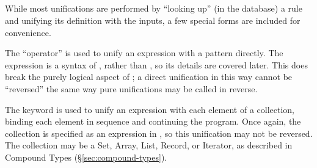 \begin{bnf*}
     \\
     \\
     \\
     \\
\end{bnf*}

While most unifications are performed by ``looking up'' (in the database)
a rule and unifying its definition with the inputs, a few special forms are
included for convenience.

The \op{=} ``operator'' is used to unify an expression with a pattern directly. The
expression is a syntax of \Poetry{}, rather than \Law{}, so its details are covered
later. This does break the purely logical aspect of \Law{}; a direct unification in
this way cannot be ``reversed'' the same way pure \Law{} unifications may be called
in reverse.

\begin{prooftree}
\end{prooftree}

The  keyword is used to unify an expression with each element of a collection,
binding each element in sequence and continuing the program. Once again, the collection
is specified as an expression in \Poetry{}, so this unification may not be reversed.
The collection may be a Set, Array, List, Record, or Iterator, as described in
Compound Types (\S\ref{sec:compound-types}).

\begin{prooftree}
\end{prooftree}

